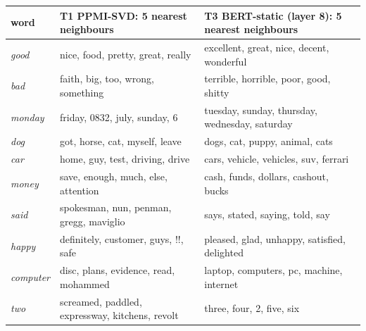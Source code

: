 \begin{tabular}{lll}
\toprule
word & T1 PPMI-SVD: 5 nearest neighbours & T3 BERT-static (layer 8): 5 nearest neighbours \\
\midrule
\textit{good} & nice, food, pretty, great, really & excellent, great, nice, decent, wonderful \\
\textit{bad} & faith, big, too, wrong, something & terrible, horrible, poor, good, shitty \\
\textit{monday} & friday, 0832, july, sunday, 6 & tuesday, sunday, thursday, wednesday, saturday \\
\textit{dog} & got, horse, cat, myself, leave & dogs, cat, puppy, animal, cats \\
\textit{car} & home, guy, test, driving, drive & cars, vehicle, vehicles, suv, ferrari \\
\textit{money} & save, enough, much, else, attention & cash, funds, dollars, cashout, bucks \\
\textit{said} & spokesman, nun, penman, gregg, maviglio & says, stated, saying, told, say \\
\textit{happy} & definitely, customer, guys, !!, safe & pleased, glad, unhappy, satisfied, delighted \\
\textit{computer} & disc, plans, evidence, read, mohammed & laptop, computers, pc, machine, internet \\
\textit{two} & screamed, paddled, expressway, kitchens, revolt & three, four, 2, five, six \\
\bottomrule
\end{tabular}
